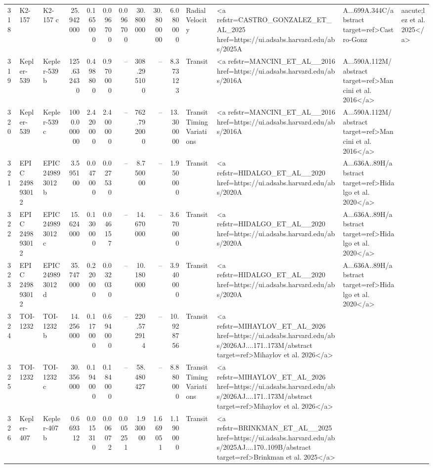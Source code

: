 \begin{tabular}{lllrrrrrrrll}
318 & K2-157 & K2-157 c & 25.942000 & 0.165000 & 0.096700 & 0.096700 & 30.800000 & 30.800000 & 6.080000 & Radial Velocity & <a refstr=CASTRO_GONZALEZ_ET_AL_2025 href=https://ui.adsabs.harvard.edu/abs/2025A&A...699A.344C/abstract target=ref>Castro-Gonz&aacute;lez et al. 2025</a> \\
319 & Kepler-539 & Kepler-539 b & 125.632430 & 0.498800 & 0.970000 & -- & 308.295100 & -- & 8.373123 & Transit & <a refstr=MANCINI_ET_AL__2016 href=https://ui.adsabs.harvard.edu/abs/2016A&A...590A.112M/abstract target=ref>Mancini et al. 2016</a> \\
320 & Kepler-539 & Kepler-539 c & 1000.000000 & 2.420000 & 2.400000 & -- & 762.792000 & -- & 13.300000 & Transit Timing Variations & <a refstr=MANCINI_ET_AL__2016 href=https://ui.adsabs.harvard.edu/abs/2016A&A...590A.112M/abstract target=ref>Mancini et al. 2016</a> \\
321 & EPIC 249893012 & EPIC 249893012 b & 3.595100 & 0.047000 & 0.027530 & -- & 8.750000 & -- & 1.950000 & Transit & <a refstr=HIDALGO_ET_AL__2020 href=https://ui.adsabs.harvard.edu/abs/2020A&A...636A..89H/abstract target=ref>Hidalgo et al. 2020</a> \\
322 & EPIC 249893012 & EPIC 249893012 c & 15.624000 & 0.130000 & 0.046157 & -- & 14.670000 & -- & 3.670000 & Transit & <a refstr=HIDALGO_ET_AL__2020 href=https://ui.adsabs.harvard.edu/abs/2020A&A...636A..89H/abstract target=ref>Hidalgo et al. 2020</a> \\
323 & EPIC 249893012 & EPIC 249893012 d & 35.747000 & 0.220000 & 0.032030 & -- & 10.180000 & -- & 3.940000 & Transit & <a refstr=HIDALGO_ET_AL__2020 href=https://ui.adsabs.harvard.edu/abs/2020A&A...636A..89H/abstract target=ref>Hidalgo et al. 2020</a> \\
324 & TOI-1232 & TOI-1232 b & 14.256000 & 0.117000 & 0.694000 & -- & 220.572914 & -- & 10.928756 & Transit & <a refstr=MIHAYLOV_ET_AL_2026 href=https://ui.adsabs.harvard.edu/abs/2026AJ....171..173M/abstract target=ref>Mihaylov et al. 2026</a> \\
325 & TOI-1232 & TOI-1232 c & 30.356000 & 0.194000 & 0.184000 & -- & 58.480427 & -- & 8.880000 & Transit Timing Variations & <a refstr=MIHAYLOV_ET_AL_2026 href=https://ui.adsabs.harvard.edu/abs/2026AJ....171..173M/abstract target=ref>Mihaylov et al. 2026</a> \\
326 & Kepler-407 & Kepler-407 b & 0.669312 & 0.015310 & 0.006072 & 0.005251 & 1.930000 & 1.669051 & 1.190000 & Transit & <a refstr=BRINKMAN_ET_AL__2025 href=https://ui.adsabs.harvard.edu/abs/2025AJ....170..109B/abstract target=ref>Brinkman et al. 2025</a> \\

\end{tabular}

